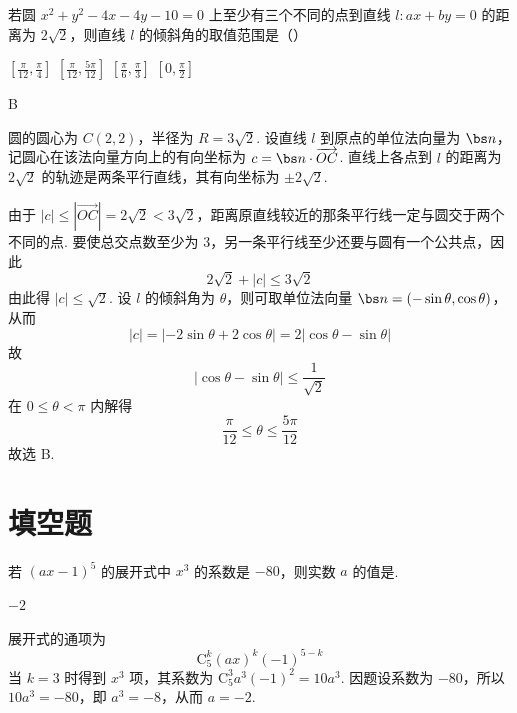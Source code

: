 \begin{problem}
若圆 \(x^{2} + y^{2} - 4x - 4y - 10 = 0\) 上至少有三个不同的点到直线 \(l: ax + by = 0\) 的距离为 \(2\sqrt{2}\)，则直线 \(l\) 的倾斜角的取值范围是（\quad）

\choices
    {\(\left[\frac{\pi}{12}, \frac{\pi}{4}\right]\)}
    {\(\left[\frac{\pi}{12}, \frac{5\pi}{12}\right]\)}
    {\(\left[\frac{\pi}{6}, \frac{\pi}{3}\right]\)}
    {\(\left[0, \frac{\pi}{2}\right]\)}
\end{problem}

\begin{answer}
B
\end{answer}

\begin{solution}
圆的圆心为 \(C(2,2)\)，半径为 \(R=3\sqrt2\). 设直线 \(l\) 到原点的单位法向量为 \(\bs n\)，记圆心在该法向量方向上的有向坐标为 \(c=\bs n\cdot\overrightarrow{OC}\). 直线上各点到 \(l\) 的距离为 \(2\sqrt2\) 的轨迹是两条平行直线，其有向坐标为 \(\pm2\sqrt2\).

由于 \(|c|\leqslant|\overrightarrow{OC}|=2\sqrt2<3\sqrt2\)，距离原直线较近的那条平行线一定与圆交于两个不同的点. 要使总交点数至少为 3，另一条平行线至少还要与圆有一个公共点，因此
\[
2\sqrt2+|c|\leqslant3\sqrt2
\]
由此得 \(|c|\leqslant\sqrt2\). 设 \(l\) 的倾斜角为 \(\theta\)，则可取单位法向量 \(\bs n=(-\sin\theta,\cos\theta)\)，从而
\[
|c|=|-2\sin\theta+2\cos\theta|=2|\cos\theta-\sin\theta|
\]
故
\[
|\cos\theta-\sin\theta|\leqslant\frac1{\sqrt2}
\]
在 \(0\leqslant\theta<\pi\) 内解得
\[
\frac\pi{12}\leqslant\theta\leqslant\frac{5\pi}{12}
\]
故选 B.
\end{solution}

\section{填空题}
\begin{problem}
若 \((ax - 1)^5\) 的展开式中 \(x^3\) 的系数是 \(-80\)，则实数 \(a\) 的值是\fillinblank{}.
\end{problem}

\begin{answer}
\(-2\)
\end{answer}

\begin{solution}
展开式的通项为
\[
\mathrm C_5^k(ax)^k(-1)^{5-k}
\]
当 \(k=3\) 时得到 \(x^3\) 项，其系数为 \(\mathrm C_5^3a^3(-1)^2=10a^3\). 因题设系数为 \(-80\)，所以 \(10a^3=-80\)，即 \(a^3=-8\)，从而 \(a=-2\).
\end{solution}

